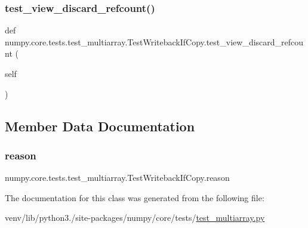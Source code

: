 \subsubsection{\texorpdfstring{test\+\_\+view\+\_\+discard\+\_\+refcount()}{test\_view\_discard\_refcount()}}
{\footnotesize\ttfamily def numpy.\+core.\+tests.\+test\+\_\+multiarray.\+Test\+Writeback\+If\+Copy.\+test\+\_\+view\+\_\+discard\+\_\+refcount (\begin{DoxyParamCaption}\item[{}]{self }\end{DoxyParamCaption})}



\subsection{Member Data Documentation}
\mbox{\label{classnumpy_1_1core_1_1tests_1_1test__multiarray_1_1TestWritebackIfCopy_ae4e33702d622c6a5316146dc77c6b3dd}} 
\subsubsection{\texorpdfstring{reason}{reason}}
{\footnotesize\ttfamily numpy.\+core.\+tests.\+test\+\_\+multiarray.\+Test\+Writeback\+If\+Copy.\+reason\hspace{0.3cm}{\ttfamily [static]}}



The documentation for this class was generated from the following file\+:\begin{DoxyCompactItemize}
\item 
venv/lib/python3./site-\/packages/numpy/core/tests/\hyperlink{core_2tests_2test__multiarray_8py}{test\+\_\+multiarray.\+py}\end{DoxyCompactItemize}
